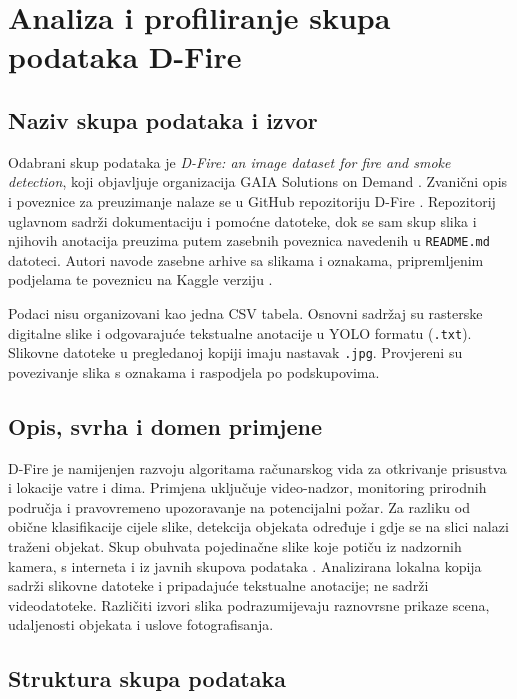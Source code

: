 
\section{Analiza i profiliranje skupa podataka D-Fire}

\subsection{Naziv skupa podataka i izvor}
Odabrani skup podataka je \emph{D-Fire: an image dataset for fire and smoke detection}, koji objavljuje organizacija GAIA Solutions on Demand \cite{dfire}. Zvanični opis i poveznice za preuzimanje nalaze se u GitHub repozitoriju D-Fire \cite{dfire}. Repozitorij uglavnom sadrži dokumentaciju i pomoćne datoteke, dok se sam skup slika i njihovih anotacija preuzima putem zasebnih poveznica navedenih u \texttt{README.md} datoteci. Autori navode zasebne arhive sa slikama i oznakama, pripremljenim podjelama te poveznicu na Kaggle verziju \cite{kaggle}.

Podaci nisu organizovani kao jedna CSV tabela. Osnovni sadržaj su rasterske digitalne slike i odgovarajuće tekstualne anotacije u YOLO formatu (\texttt{.txt}). Slikovne datoteke u pregledanoj kopiji imaju nastavak \texttt{.jpg}. Provjereni su povezivanje slika s oznakama i raspodjela po podskupovima.

\subsection{Opis, svrha i domen primjene}
D-Fire je namijenjen razvoju algoritama računarskog vida za otkrivanje prisustva i lokacije vatre i dima. Primjena uključuje video-nadzor, monitoring prirodnih područja i pravovremeno upozoravanje na potencijalni požar. Za razliku od obične klasifikacije cijele slike, detekcija objekata određuje i gdje se na slici nalazi traženi objekat. Skup obuhvata pojedinačne slike koje potiču iz nadzornih kamera, s interneta i iz javnih skupova podataka \cite{dfire}. Analizirana lokalna kopija sadrži slikovne datoteke i pripadajuće tekstualne anotacije; ne sadrži videodatoteke. Različiti izvori slika podrazumijevaju raznovrsne prikaze scena, udaljenosti objekata i uslove fotografisanja.

\subsection{Struktura skupa podataka}

